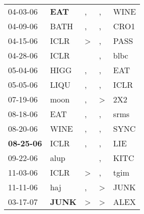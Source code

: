 \begin{supertabular}{p{0.07\textwidth}p{0.06\textwidth}p{0.02\textwidth}p{0.02\textwidth}p{0.06\textwidth}}
          04-03-06\textsuperscript{} &   \textbf{EAT\textsuperscript{}} &                , &                , &           WINE\textsuperscript{} \\
          04-09-06\textsuperscript{} &           BATH\textsuperscript{} &                , &                , &           CRO1\textsuperscript{} \\
          04-15-06\textsuperscript{} &           ICLR\textsuperscript{} &     \textgreater &                , &           PASS\textsuperscript{} \\
          04-28-06\textsuperscript{} &           ICLR\textsuperscript{} &                  &                , &           blbc\textsuperscript{} \\
          05-04-06\textsuperscript{} &           HIGG\textsuperscript{} &                , &                , &            EAT\textsuperscript{} \\
          05-05-06\textsuperscript{} &           LIQU\textsuperscript{} &                , &                , &           ICLR\textsuperscript{} \\
          07-19-06\textsuperscript{} &           moon\textsuperscript{} &                , &     \textgreater &            2X2\textsuperscript{} \\
          08-18-06\textsuperscript{} &            EAT\textsuperscript{} &                , &                , &           srms\textsuperscript{} \\
          08-20-06\textsuperscript{} &           WINE\textsuperscript{} &                , &                , &           SYNC\textsuperscript{} \\
 \textbf{08-25-06\textsuperscript{}} &           ICLR\textsuperscript{} &                , &                , &            LIE\textsuperscript{} \\
          09-22-06\textsuperscript{} &           alup\textsuperscript{} &                  &                , &           KITC\textsuperscript{} \\
          11-03-06\textsuperscript{} &           ICLR\textsuperscript{} &     \textgreater &                , &           tgim\textsuperscript{} \\
          11-11-06\textsuperscript{} &            haj\textsuperscript{} &                , &     \textgreater &           JUNK\textsuperscript{} \\
          03-17-07\textsuperscript{} &  \textbf{JUNK\textsuperscript{}} &     \textgreater &     \textgreater &           ALEX\textsuperscript{} \\

\end{supertabular}
